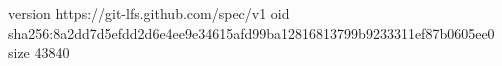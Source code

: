 version https://git-lfs.github.com/spec/v1
oid sha256:8a2dd7d5efdd2d6e4ee9e34615afd99ba12816813799b9233311ef87b0605ee0
size 43840
